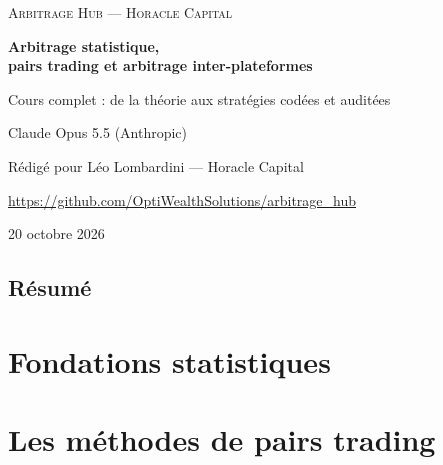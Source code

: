 \documentclass[11pt,a4paper,openany]{report}
\begin{document}
\begin{titlepage}
\centering
\vspace*{3cm}
{\Large\scshape Arbitrage Hub — Horacle Capital\par}
\vspace{1.2cm}
{\huge\bfseries Arbitrage statistique,\\[0.3em] pairs trading et arbitrage inter-plateformes\par}
\vspace{0.8cm}
{\Large Cours complet : de la théorie aux stratégies codées et auditées\par}
\vspace{2cm}
{\large Claude Opus 5.5 (Anthropic)\par}
\vspace{0.3cm}
{\normalsize Rédigé pour Léo Lombardini — Horacle Capital\par}
\vspace{0.2cm}
{\small\url{https://github.com/OptiWealthSolutions/arbitrage_hub}\par}
\vfill
{\large 20 octobre 2026\par}
\end{titlepage}

\chapter*{Résumé}


\tableofcontents

\cleardoublepage
{}

\setcounter{chapter}{-1}


\part{Fondations statistiques}






\part{Les méthodes de pairs trading}






\end{document}
